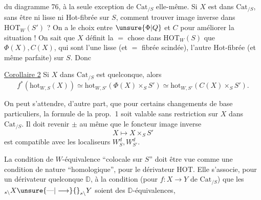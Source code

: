 du diagramme 76, à la seule exception de $\mathrm{Cat}_{/S}$ elle-même. Si $X$ est dans $\mathrm{Cat}_{/S}$, sans être ni lisse ni Hot-fibrée sur $S$, comment trouver image inverse dans $\mathrm{HOT}_W(S')$ ? On a le choix entre $\unsure{\Phi|Q}$ et $C$ pour améliorer la situation ! On sait que $X$ définit la $=$ chose dans $\mathrm{HOT}_W(S)$ que $\Phi(X),C(X)$, qui sont l'une lisse (et $=$ fibrée scindée), l'autre Hot-fibrée (et même parfaite) sur $S$. Donc

\uline{Corollaire 2} Si $X$ dans $\mathrm{Cat}_{/S}$ est quelconque, alors
\[
f^*(\mathrm{hot}_{W,S}(X))\simeq\mathrm{hot}_{W,S'}(\Phi(X)\times_S S')\simeq\mathrm{hot}_{W,S'}(C(X)\times_S S').
\]

On peut s'attendre, d'autre part, que pour certains changements de base particuliers, la formule de la prop.~1 soit valable sans restriction sur $X$ dans $\mathrm{Cat}_{/S}$. Il doit revenir $\pm$ au même que le foncteur image inverse
\[
X\longmapsto X\times_S S'
\]
est compatible avec les localiseurs $W_S^d,W_{S'}^d$.

La  condition de $W$-équivalence ``colocale sur $S$'' doit être vue comme une condition de nature ``homologique'', pour le dérivateur $\mathrm{HOT}$. Elle s'associe, pour un dérivateur quelconque $\mathbb D$, à la condition (pour $f:X\longrightarrow Y$ de $\mathrm{Cat}_{/S}$) que  les $ {}_{s\backslash}X\unsure{\text{---}|\longrightarrow}{}_{s\backslash}Y$ soient des $\mathbb D$-équivalences,
